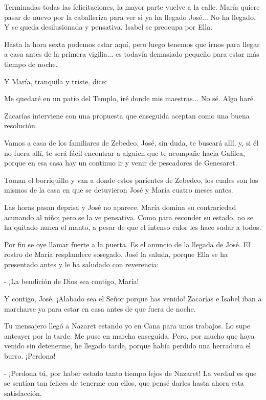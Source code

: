 \documentclass[12pt, twoside, openright]{book} %
\begin{document}
Terminadas todas las felicitaciones, la mayor parte vuelve a la calle. María quiere pasar de nuevo por la caballeriza para ver si ya ha llegado José... No ha llegado. Y se queda desilusionada y pensativa. Isabel se preocupa por Ella. 

Hasta la hora sexta podemos estar aquí, pero luego tenemos que irnos para llegar a casa antes de la primera vigilia... es todavía demasiado pequeño para estar más tiempo de noche. 

Y María, tranquila y triste, dice: 

Me quedaré en un patio del Templo, iré donde mis maestras... No sé. Algo haré. 

Zacarías interviene con una propuesta que enseguida aceptan como una buena resolución. 

Vamos a casa de los familiares de Zebedeo. José, sin duda, te buscará allí, y, si él no fuera allí, te será fácil encontrar a alguien que te acompañe hacia Galilea, porque en esa casa hay un continuo ir y venir de pescadores de Genesaret. 

Toman el borriquillo y van a donde estos parientes de Zebedeo, los cuales son los mismos de la casa en que se detuvieron José y María cuatro meses antes. 

Las horas pasan deprisa y José no aparece. María domina su contrariedad acunando al niño; pero se la ve pensativa. Como para esconder su estado, no se ha quitado nunca el manto, a pesar de que el intenso calor les hace sudar a todos. 

Por fin se oye llamar fuerte a la puerta. Es el anuncio de la llegada de José. El rostro de María resplandece sosegado. José la saluda, porque Ella se ha presentado antes y le ha saludado con reverencia: 

- ¡La bendición de Dios sea contigo, María! 

Y contigo, José. ¡Alabado sea el Señor porque has venido! Zacarías e Isabel iban a marcharse ya para estar en casa antes de que fuera de noche. 

Tu mensajero llegó a Nazaret estando yo en Cana para unos trabajos. Lo supe anteayer por la tarde. Me puse en marcha enseguida. Pero, por mucho que haya venido sin detenerme, he llegado tarde, porque había perdido una herradura el burro. ¡Perdona! 

- ¡Perdona tú, por haber estado tanto tiempo lejos de Nazaret! La verdad es que se sentían tan felices de tenerme con ellos, que pensé darles hasta ahora esta satisfacción. 
\end{document}
